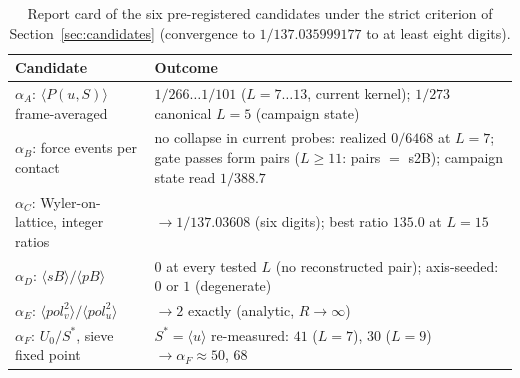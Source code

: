 \documentclass[11pt,a4paper]{article}
\begin{document}
\begin{table}[ht]
\centering
\caption{Report card of the six pre-registered candidates under the strict
criterion of Section~\ref{sec:candidates} (convergence to
$1/137.035999177$ to at least eight digits).}
\label{tab:report}
\begin{tabular}{l p{8.8cm}}
\hline
Candidate & Outcome \\
\hline
$\alpha_A$: $\langle P(u,S)\rangle$ frame-averaged
          & $1/266\ldots 1/101$ ($L=7\ldots 13$, current kernel); $1/273$ canonical $L=5$ (campaign state) \\
$\alpha_B$: force events per contact
          & no collapse in current probes: realized $0/6468$ at $L=7$; gate passes form pairs ($L\ge11$: pairs $=$ s2B); campaign state read $1/388.7$ \\
$\alpha_C$: Wyler-on-lattice, integer ratios
          & $\to 1/137.03608$ (six digits); best ratio $135.0$ at $L=15$ \\
$\alpha_D$: $\langle sB\rangle/\langle pB\rangle$
          & $0$ at every tested $L$ (no reconstructed pair); axis-seeded: $0$ or $1$ (degenerate) \\
$\alpha_E$: $\langle pol_v^2\rangle/\langle pol_u^2\rangle$
          & $\to 2$ exactly (analytic, $R\to\infty$) \\
$\alpha_F$: $U_0/S^*$, sieve fixed point
          & $S^*=\langle u\rangle$ re-measured: $41$ ($L=7$), $30$ ($L=9$) $\to \alpha_F \approx 50$, $68$ \\
\hline
\end{tabular}
\end{table}
\end{document}
